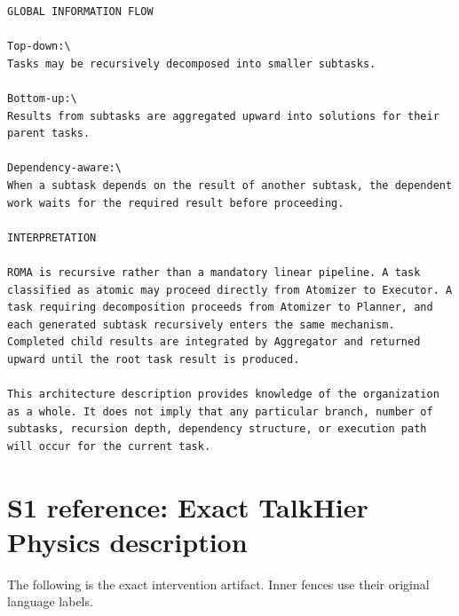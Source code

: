 \documentclass[10pt,letterpaper,twocolumn]{article}
\begin{document}
\begin{Verbatim}[fontsize=\small,breaklines=true,breakanywhere=true]
GLOBAL INFORMATION FLOW

Top-down:\
Tasks may be recursively decomposed into smaller subtasks.

Bottom-up:\
Results from subtasks are aggregated upward into solutions for their parent tasks.

Dependency-aware:\
When a subtask depends on the result of another subtask, the dependent work waits for the required result before proceeding.

INTERPRETATION

ROMA is recursive rather than a mandatory linear pipeline. A task classified as atomic may proceed directly from Atomizer to Executor. A task requiring decomposition proceeds from Atomizer to Planner, and each generated subtask recursively enters the same mechanism. Completed child results are integrated by Aggregator and returned upward until the root task result is produced.

This architecture description provides knowledge of the organization as a whole. It does not imply that any particular branch, number of subtasks, recursion depth, dependency structure, or execution path will occur for the current task.

\end{Verbatim}

\section*{S1 reference: Exact TalkHier Physics description}

The following is the exact intervention artifact. Inner fences use their original language labels.
\end{document}
